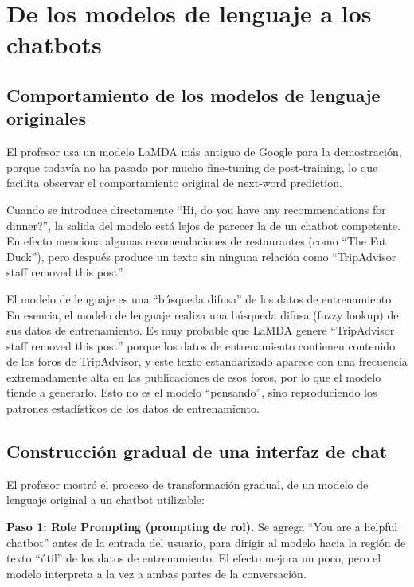 \section{De los modelos de lenguaje a los chatbots}

\subsection{Comportamiento de los modelos de lenguaje originales}

El profesor usa un modelo LaMDA más antiguo de Google para la demostración, porque todavía no ha pasado por mucho fine-tuning de post-training, lo que facilita observar el comportamiento original de next-word prediction.

Cuando se introduce directamente ``Hi, do you have any recommendations for dinner?'', la salida del modelo está lejos de parecer la de un chatbot competente. En efecto menciona algunas recomendaciones de restaurantes (como ``The Fat Duck''), pero después produce un texto sin ninguna relación como ``TripAdvisor staff removed this post''.

\begin{importantbox}{El modelo de lenguaje es una ``búsqueda difusa'' de los datos de entrenamiento}
En esencia, el modelo de lenguaje realiza una búsqueda difusa (fuzzy lookup) de sus datos de entrenamiento. Es muy probable que LaMDA genere ``TripAdvisor staff removed this post'' porque los datos de entrenamiento contienen contenido de los foros de TripAdvisor, y este texto estandarizado aparece con una frecuencia extremadamente alta en las publicaciones de esos foros, por lo que el modelo tiende a generarlo. Esto no es el modelo ``pensando'', sino reproduciendo los patrones estadísticos de los datos de entrenamiento.
\end{importantbox}

\subsection{Construcción gradual de una interfaz de chat}

El profesor mostró el proceso de transformación gradual, de un modelo de lenguaje original a un chatbot utilizable:

\textbf{Paso 1: Role Prompting (prompting de rol).} Se agrega ``You are a helpful chatbot'' antes de la entrada del usuario, para dirigir al modelo hacia la región de texto ``útil'' de los datos de entrenamiento. El efecto mejora un poco, pero el modelo interpreta a la vez a ambas partes de la conversación.

